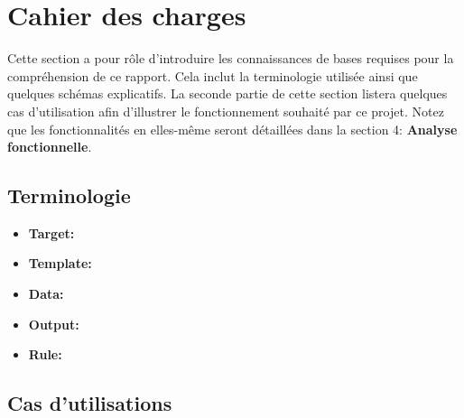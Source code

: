 \section{Cahier des charges}

	Cette section a pour rôle d'introduire les connaissances de bases requises pour la compréhension de ce rapport. Cela inclut la terminologie utilisée ainsi que quelques schémas explicatifs. La seconde partie de cette section listera quelques cas d'utilisation afin d'illustrer le fonctionnement souhaité par ce projet. Notez que les fonctionnalités en elles-même seront détaillées dans la section 4: \textbf{Analyse fonctionnelle}.
	
	\subsection{Terminologie}
		
		\begin{itemize}
			\item \textbf{Target:}
			\item \textbf{Template:}
			\item \textbf{Data:}
			\item \textbf{Output:}
			\item \textbf{Rule:} 
		\end{itemize}

	\subsection{Cas d'utilisations}
	
	